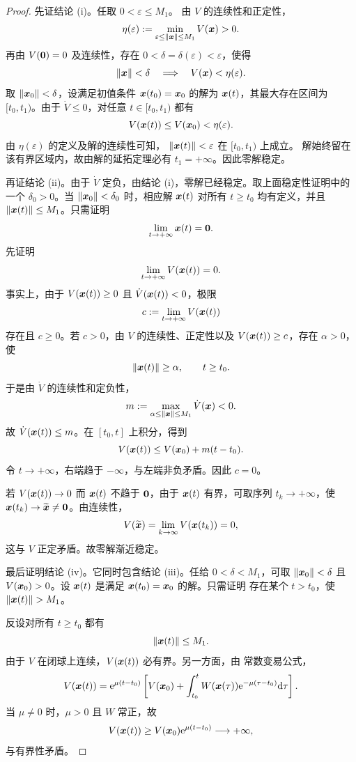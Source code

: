 \begin{proof}
	先证结论 \textnormal{(i)}。任取 $0<\varepsilon\leq M_1$。
	由 $V$ 的连续性和正定性，
	\[
		\eta(\varepsilon)
		\mathrel{:=}
		\min_{\varepsilon\leq\left\| \boldsymbol{x} \right\|\leq M_1}
		V(\boldsymbol{x})>0.
	\]
	再由 $V(\boldsymbol{0})=0$ 及连续性，存在
	$0<\delta=\delta(\varepsilon)<\varepsilon$，使得
	\[
		\left\| \boldsymbol{x} \right\|<\delta
		\quad\Longrightarrow\quad
		V(\boldsymbol{x})<\eta(\varepsilon).
	\]
	取 $\left\| \boldsymbol{x}_0 \right\|<\delta$，设满足初值条件
	$\boldsymbol{x}(t_0)=\boldsymbol{x}_0$ 的解为 $\boldsymbol{x}(t)$，其最大存在区间为
	$[t_0,t_1)$。由于 $\dot V\leq0$，对任意
	$t\in[t_0,t_1)$ 都有
	\[
		V(\boldsymbol{x}(t))
		\leq V(\boldsymbol{x}_0)<\eta(\varepsilon).
	\]
	由 $\eta(\varepsilon)$ 的定义及解的连续性可知，
	$\left\| \boldsymbol{x}(t) \right\|<\varepsilon$ 在 $[t_0,t_1)$ 上成立。
	解始终留在该有界区域内，故由解的延拓定理必有
	$t_1=+\infty$。因此零解稳定。

	再证结论 \textnormal{(ii)}。由于 $\dot V$ 定负，由结论
	\textnormal{(i)}，零解已经稳定。取上面稳定性证明中的一个
	$\delta_0>0$。当 $\left\| \boldsymbol{x}_0 \right\|<\delta_0$ 时，相应解
	$\boldsymbol{x}(t)$ 对所有 $t\geq t_0$ 均有定义，并且
	$\left\| \boldsymbol{x}(t) \right\|\leq M_1$。只需证明
	\[
		\lim_{t\to+\infty}\boldsymbol{x}(t)=\boldsymbol{0}.
	\]
	先证明
	\[
		\lim_{t\to+\infty}V(\boldsymbol{x}(t))=0.
	\]
	事实上，由于 $V(\boldsymbol{x}(t))\geq0$ 且
	$\dot V(\boldsymbol{x}(t))<0$，极限
	\[
		c\mathrel{:=}
		\lim_{t\to+\infty}V(\boldsymbol{x}(t))
	\]
	存在且 $c\geq0$。若 $c>0$，由 $V$ 的连续性、正定性以及
	$V(\boldsymbol{x}(t))\geq c$，存在 $\alpha>0$，使
	\[
		\left\| \boldsymbol{x}(t) \right\|\geq\alpha,
		\qquad t\geq t_0.
	\]
	于是由 $\dot V$ 的连续性和定负性，
	\[
		m\mathrel{:=}
		\max_{\alpha\leq\left\| \boldsymbol{x} \right\|\leq M_1}
		\dot V(\boldsymbol{x})<0.
	\]
	故 $\dot V(\boldsymbol{x}(t))\leq m$。在 $[t_0,t]$ 上积分，得到
	\[
		V(\boldsymbol{x}(t))
		\leq V(\boldsymbol{x}_0)+m(t-t_0).
	\]
	令 $t\to+\infty$，右端趋于 $-\infty$，与左端非负矛盾。因此
	$c=0$。

	若 $V(\boldsymbol{x}(t))\to0$ 而 $\boldsymbol{x}(t)$ 不趋于
	$\boldsymbol{0}$，由于 $\boldsymbol{x}(t)$ 有界，可取序列
	$t_k\to+\infty$，使
	$\boldsymbol{x}(t_k)\to\widetilde{\boldsymbol{x}}\neq\boldsymbol{0}$。由连续性，
	\[
		V(\widetilde{\boldsymbol{x}})
		=\lim_{k\to\infty}V(\boldsymbol{x}(t_k))=0,
	\]
	这与 $V$ 正定矛盾。故零解渐近稳定。

	最后证明结论 \textnormal{(iv)}。它同时包含结论
	\textnormal{(iii)}。任给 $0<\delta<M_1$，可取
	$\left\| \boldsymbol{x}_0 \right\|<\delta$ 且 $V(\boldsymbol{x}_0)>0$。设
	$\boldsymbol{x}(t)$ 是满足 $\boldsymbol{x}(t_0)=\boldsymbol{x}_0$ 的解。只需证明
	存在某个 $t>t_0$，使 $\norm{\vect{x}(t)}>M_1$。

	反设对所有 $t\geq t_0$ 都有
	\[
		\left\| \boldsymbol{x}(t) \right\|\leq M_1.
	\]
	由于 $V$ 在闭球上连续，$V(\boldsymbol{x}(t))$ 必有界。另一方面，由
	常数变易公式，
	\[
		V(\boldsymbol{x}(t))
		=\mathrm{e}^{\mu(t-t_0)}
		\left[
		V(\boldsymbol{x}_0)
		+\int_{t_0}^t
		W(\boldsymbol{x}(\tau))
		\mathrm{e}^{-\mu(\tau-t_0)}\mathrm{d}\tau
		\right].
	\]
	当 $\mu\neq0$ 时，$\mu>0$ 且 $W$ 常正，故
	\[
		V(\boldsymbol{x}(t))
		\geq V(\boldsymbol{x}_0)\mathrm{e}^{\mu(t-t_0)}
		\longrightarrow+\infty,
	\]
	与有界性矛盾。


\end{proof}
